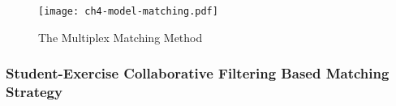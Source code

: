 \begin{figure}[htbp!]
  \centering
  \texttt{[image: ch4-model-matching.pdf]}
  \caption{The Multiplex Matching Method}\label{fig:ch4-matching}
\end{figure}

\subsubsection{Student-Exercise Collaborative Filtering Based Matching Strategy}



